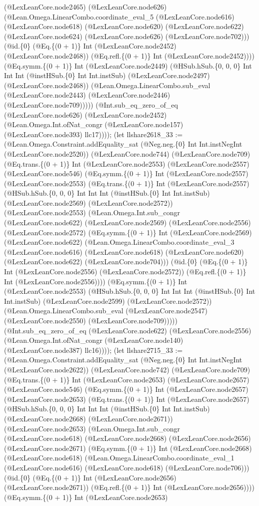 \documentclass[11pt]{article}
\begin{document}
(@LexLeanCore.node2465) (@LexLeanCore.node626) (@Lean.Omega.LinearCombo.coordinate\_eval\_5 (@LexLeanCore.node616) (@LexLeanCore.node618) (@LexLeanCore.node620) (@LexLeanCore.node622) (@LexLeanCore.node624) (@LexLeanCore.node626) (@LexLeanCore.node702))) (@id.\{0\} (@Eq.\{(0 + 1)\} Int (@LexLeanCore.node2452) (@LexLeanCore.node2468)) (@Eq.refl.\{(0 + 1)\} Int (@LexLeanCore.node2452)))) (@Eq.symm.\{(0 + 1)\} Int (@LexLeanCore.node2449) (@HSub.hSub.\{0, 0, 0\} Int Int Int (@instHSub.\{0\} Int Int.instSub) (@LexLeanCore.node2497) (@LexLeanCore.node2468)) (@Lean.Omega.LinearCombo.sub\_eval (@LexLeanCore.node2443) (@LexLeanCore.node2446) (@LexLeanCore.node709))))) (@Int.sub\_eq\_zero\_of\_eq (@LexLeanCore.node626) (@LexLeanCore.node2452) (@Lean.Omega.Int.ofNat\_congr (@LexLeanCore.node157) (@LexLeanCore.node393) llc17)))); (let llshare2618\_33 := (@Lean.Omega.Constraint.addEquality\_sat (@Neg.neg.\{0\} Int Int.instNegInt (@LexLeanCore.node2520)) (@LexLeanCore.node744) (@LexLeanCore.node709) (@Eq.trans.\{(0 + 1)\} Int (@LexLeanCore.node2553) (@LexLeanCore.node2557) (@LexLeanCore.node546) (@Eq.symm.\{(0 + 1)\} Int (@LexLeanCore.node2557) (@LexLeanCore.node2553) (@Eq.trans.\{(0 + 1)\} Int (@LexLeanCore.node2557) (@HSub.hSub.\{0, 0, 0\} Int Int Int (@instHSub.\{0\} Int Int.instSub) (@LexLeanCore.node2569) (@LexLeanCore.node2572)) (@LexLeanCore.node2553) (@Lean.Omega.Int.sub\_congr (@LexLeanCore.node622) (@LexLeanCore.node2569) (@LexLeanCore.node2556) (@LexLeanCore.node2572) (@Eq.symm.\{(0 + 1)\} Int (@LexLeanCore.node2569) (@LexLeanCore.node622) (@Lean.Omega.LinearCombo.coordinate\_eval\_3 (@LexLeanCore.node616) (@LexLeanCore.node618) (@LexLeanCore.node620) (@LexLeanCore.node622) (@LexLeanCore.node704))) (@id.\{0\} (@Eq.\{(0 + 1)\} Int (@LexLeanCore.node2556) (@LexLeanCore.node2572)) (@Eq.refl.\{(0 + 1)\} Int (@LexLeanCore.node2556)))) (@Eq.symm.\{(0 + 1)\} Int (@LexLeanCore.node2553) (@HSub.hSub.\{0, 0, 0\} Int Int Int (@instHSub.\{0\} Int Int.instSub) (@LexLeanCore.node2599) (@LexLeanCore.node2572)) (@Lean.Omega.LinearCombo.sub\_eval (@LexLeanCore.node2547) (@LexLeanCore.node2550) (@LexLeanCore.node709))))) (@Int.sub\_eq\_zero\_of\_eq (@LexLeanCore.node622) (@LexLeanCore.node2556) (@Lean.Omega.Int.ofNat\_congr (@LexLeanCore.node140) (@LexLeanCore.node387) llc16)))); (let llshare2715\_33 := (@Lean.Omega.Constraint.addEquality\_sat (@Neg.neg.\{0\} Int Int.instNegInt (@LexLeanCore.node2622)) (@LexLeanCore.node742) (@LexLeanCore.node709) (@Eq.trans.\{(0 + 1)\} Int (@LexLeanCore.node2653) (@LexLeanCore.node2657) (@LexLeanCore.node546) (@Eq.symm.\{(0 + 1)\} Int (@LexLeanCore.node2657) (@LexLeanCore.node2653) (@Eq.trans.\{(0 + 1)\} Int (@LexLeanCore.node2657) (@HSub.hSub.\{0, 0, 0\} Int Int Int (@instHSub.\{0\} Int Int.instSub) (@LexLeanCore.node2668) (@LexLeanCore.node2671)) (@LexLeanCore.node2653) (@Lean.Omega.Int.sub\_congr (@LexLeanCore.node618) (@LexLeanCore.node2668) (@LexLeanCore.node2656) (@LexLeanCore.node2671) (@Eq.symm.\{(0 + 1)\} Int (@LexLeanCore.node2668) (@LexLeanCore.node618) (@Lean.Omega.LinearCombo.coordinate\_eval\_1 (@LexLeanCore.node616) (@LexLeanCore.node618) (@LexLeanCore.node706))) (@id.\{0\} (@Eq.\{(0 + 1)\} Int (@LexLeanCore.node2656) (@LexLeanCore.node2671)) (@Eq.refl.\{(0 + 1)\} Int (@LexLeanCore.node2656)))) (@Eq.symm.\{(0 + 1)\} Int (@LexLeanCore.node2653) 
\end{document}
